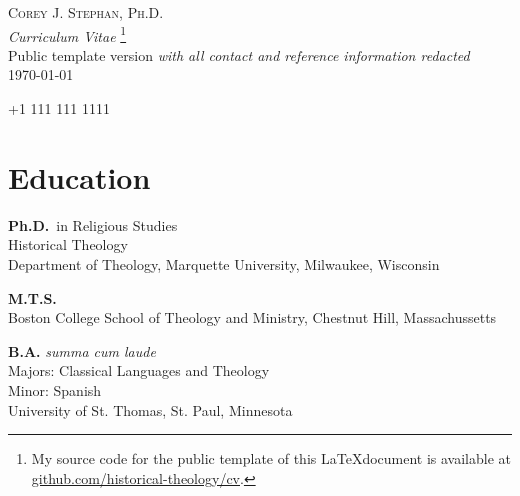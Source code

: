 \documentclass[letterpaper,12pt]{article}
\newcommand{\years}[1]{%
  {\reversemarginpar\strut\marginnote{{\small#1}}}%
}
\begin{document}
{
\begin{center}
  \Huge \textsc{Corey J. Stephan, Ph.D.} \\
  
  \normalsize \emph{Curriculum Vitae}
  \footnote{My source code for the public template of this \LaTeX\space document is available at \href{https:www.github.com/historical-theology/cv}{github.com/historical-theology/cv}.} \\
	Public template version \emph{with all contact and reference information redacted}\\ 
   														
  \today
\end{center}
  \begin{center}
    \normalsize
      \faPhone\space+1 111 111 1111 \space 															
      \enspace\faEnvelope{} \space
      \enspace\faHome{}	
  \end{center}
}



\section*{Education}

\years{2022}%
%
\textbf{Ph.D.}\ in Religious Studies \\
Historical Theology \\
Department of Theology, Marquette University, Milwaukee, Wisconsin \\ [.3cm]
\years{2017}%
%
\textbf{M.T.S.}\ \\
Boston College School of Theology and Ministry, Chestnut Hill, Massachussetts \\ [.3cm]
\years{2015}%
%
\textbf{B.A.} \emph{summa cum laude} \\
Majors: Classical Languages and Theology \\ 
Minor: Spanish \\
University of St. Thomas, St. Paul, Minnesota
\end{document}
